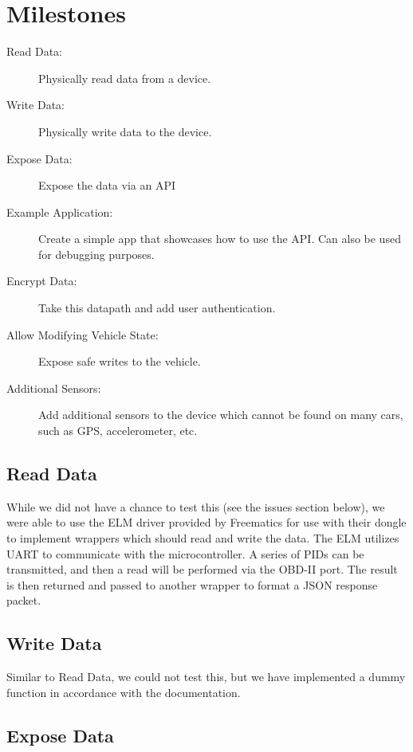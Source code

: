 \documentclass[10pt,letterpaper,unboxed,cm]{article}
\begin{document}
\newpage
\section{Milestones}

\begin{description}

\item [Read Data:] Physically read data from a device.
\item [Write Data:] Physically write data to the device.
\item [Expose Data:] Expose the data via an API
\item [Example Application:] Create a simple app that showcases how to use the API. Can also be used for debugging purposes.
\item [Encrypt Data:] Take this datapath and add user authentication.
\item [Allow Modifying Vehicle State:] Expose safe writes to the vehicle.
\item [Additional Sensors:] Add additional sensors to the device which cannot be found on many cars, such as GPS, accelerometer, etc.

\end{description}

\subsection{Read Data}

While we did not have a chance to test this (see the issues section below), we were able to use the ELM driver provided by Freematics for use with their dongle to implement wrappers which should read and write the data. The ELM utilizes UART to communicate with the microcontroller. A series of PIDs can be transmitted, and then a read will be performed via the OBD-II port. The result is then returned and passed to another wrapper to format a JSON response packet.

\subsection{Write Data}

Similar to Read Data, we could not test this, but we have implemented a dummy function in accordance with the documentation.

\subsection{Expose Data}
\end{document}

